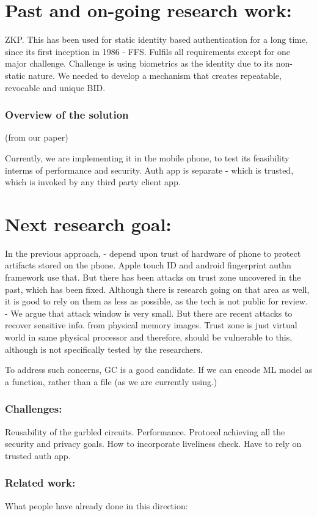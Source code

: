 \documentclass[11pt]{article}
\begin{document}
\section{Past and on-going research work:}
ZKP. This has been used for static identity based authentication for a long time, since its first inception in 1986 - FFS. 
Fulfils all requirements except for one major challenge.
Challenge is using biometrics as the identity due to its non-static nature. We needed to develop a mechanism that creates repeatable, revocable and 
unique BID.
\subsubsection{Overview of the solution}
(from our paper)

Currently, we are implementing it in the mobile phone, to test its feasibility interms of performance and security.
Auth app is separate - which is trusted, which is invoked by any third party client app.
\section{Next research goal:}
In the previous approach, 
- depend upon trust of hardware of phone to protect artifacts stored on the phone. Apple touch ID and android fingerprint authn framework use that. 
But there has been attacks on trust zone uncovered in the past, which has been fixed. Although there is research going on that 
area as well, it is good to rely on them as less as possible, as the tech is not public for review.
- We argue that attack window is very small. But there are recent attacks to recover sensitive info. from physical memory images. Trust zone is just 
virtual world in same physical processor and therefore, should be vulnerable to this, although is not specifically tested by the researchers.

To address such concerns, GC is a good candidate. If we can encode ML model as a function, rather than a file (as we are currently using.)
\subsubsection*{Challenges:}
Reusability of the garbled circuits.
Performance. Protocol achieving all the security and privacy goals.
How to incorporate liveliness check. Have to rely on trusted auth app.
\subsubsection*{Related work:}
What people have already done in this direction:
\end{document}
